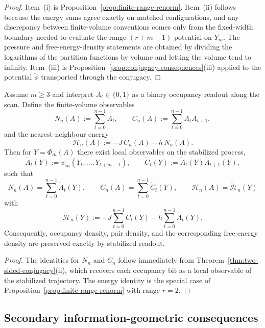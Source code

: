 \begin{proof}
Item~(i) is Proposition~\ref{prop:finite-range-renorm}. Item~(ii) follows because the energy sums agree exactly on matched configurations, and any discrepancy between finite-volume conventions comes only from the fixed-width boundary needed to evaluate the range-$(r+m-1)$ potential on $Y_m$. The pressure and free-energy-density statements are obtained by dividing the logarithms of the partition functions by volume and letting the volume tend to infinity. Item~(iii) is Proposition~\ref{prop:conjugacy-consequences}(iii) applied to the potential $\widetilde{\phi}$ transported through the conjugacy.
\end{proof}

\begin{corollary}\label{cor:occupancy-energy}
Assume $m\ge 3$ and interpret $A_t\in\{0,1\}$ as a binary occupancy readout along the scan. Define the finite-volume observables
\[
N_n(A):=\sum_{t=0}^{n-1}A_t,
\qquad
C_n(A):=\sum_{t=0}^{n-1}A_tA_{t+1},
\]
and the nearest-neighbour energy
\[
\mathcal H_n(A):=-J\,C_n(A)-h\,N_n(A).
\]
Then for $Y=\Phi_m(A)$ there exist local observables on the stabilized process,
\[
\widetilde A_t(Y):=\psi_m(Y_t,\dots,Y_{t+m-1}),
\qquad
\widetilde C_t(Y):=\widetilde A_t(Y)\widetilde A_{t+1}(Y),
\]
such that
\[
N_n(A)=\sum_{t=0}^{n-1}\widetilde A_t(Y),
\qquad
C_n(A)=\sum_{t=0}^{n-1}\widetilde C_t(Y),
\qquad
\mathcal H_n(A)=\widetilde{\mathcal H}_n(Y)
\]
with
\[
\widetilde{\mathcal H}_n(Y):=-J\sum_{t=0}^{n-1}\widetilde C_t(Y)-h\sum_{t=0}^{n-1}\widetilde A_t(Y).
\]
Consequently, occupancy density, pair density, and the corresponding free-energy density are preserved exactly by stabilized readout.
\end{corollary}

\begin{proof}
The identities for $N_n$ and $C_n$ follow immediately from Theorem~\ref{thm:two-sided-conjugacy}(ii), which recovers each occupancy bit as a local observable of the stabilized trajectory. The energy identity is the special case of Proposition~\ref{prop:finite-range-renorm} with range $r=2$.
\end{proof}

\subsection{Secondary information-geometric consequences}\label{sec:measurement:info}

